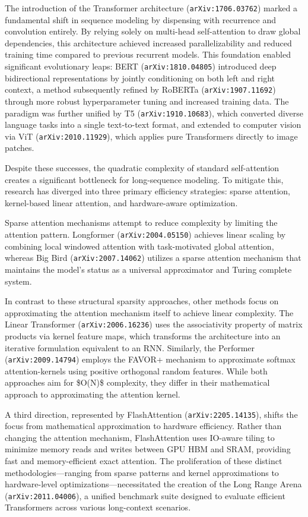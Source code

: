 \documentclass[11pt]{article}
\begin{document}
The introduction of the Transformer architecture (\texttt{arXiv:1706.03762}) marked a fundamental shift in sequence modeling by dispensing with recurrence and convolution entirely. By relying solely on multi-head self-attention to draw global dependencies, this architecture achieved increased parallelizability and reduced training time compared to previous recurrent models. This foundation enabled significant evolutionary leaps: BERT (\texttt{arXiv:1810.04805}) introduced deep bidirectional representations by jointly conditioning on both left and right context, a method subsequently refined by RoBERTa (\texttt{arXiv:1907.11692}) through more robust hyperparameter tuning and increased training data. The paradigm was further unified by T5 (\texttt{arXiv:1910.10683}), which converted diverse language tasks into a single text-to-text format, and extended to computer vision via ViT (\texttt{arXiv:2010.11929}), which applies pure Transformers directly to image patches.

Despite these successes, the quadratic complexity of standard self-attention creates a significant bottleneck for long-sequence modeling. To mitigate this, research has diverged into three primary efficiency strategies: sparse attention, kernel-based linear attention, and hardware-aware optimization.

Sparse attention mechanisms attempt to reduce complexity by limiting the attention pattern. Longformer (\texttt{arXiv:2004.05150}) achieves linear scaling by combining local windowed attention with task-motivated global attention, whereas Big Bird (\texttt{arXiv:2007.14062}) utilizes a sparse attention mechanism that maintains the model's status as a universal approximator and Turing complete system.

In contrast to these structural sparsity approaches, other methods focus on approximating the attention mechanism itself to achieve linear complexity. The Linear Transformer (\texttt{arXiv:2006.16236}) uses the associativity property of matrix products via kernel feature maps, which transforms the architecture into an iterative formulation equivalent to an RNN. Similarly, the Performer (\texttt{arXiv:2009.14794}) employs the FAVOR+ mechanism to approximate softmax attention-kernels using positive orthogonal random features. While both approaches aim for \$O(N)\$ complexity, they differ in their mathematical approach to approximating the attention kernel.

A third direction, represented by FlashAttention (\texttt{arXiv:2205.14135}), shifts the focus from mathematical approximation to hardware efficiency. Rather than changing the attention mechanism, FlashAttention uses IO-aware tiling to minimize memory reads and writes between GPU HBM and SRAM, providing fast and memory-efficient exact attention. The proliferation of these distinct methodologies—ranging from sparse patterns and kernel approximations to hardware-level optimizations—necessitated the creation of the Long Range Arena (\texttt{arXiv:2011.04006}), a unified benchmark suite designed to evaluate efficient Transformers across various long-context scenarios.
\end{document}
